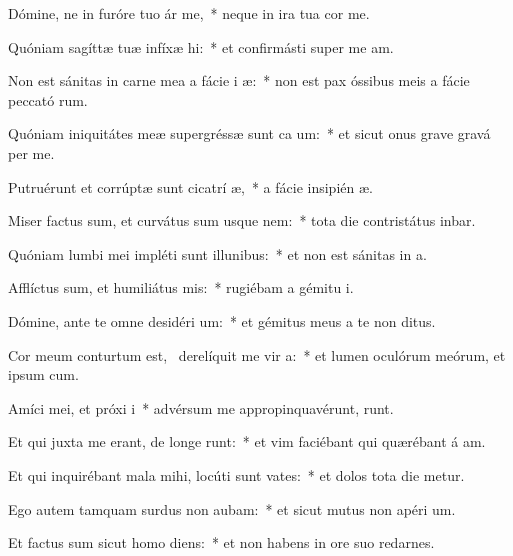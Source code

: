 \item Dómine, ne in furóre tuo ár me,~* neque in ira tua cor me.
\item Quóniam sagíttæ tuæ infíxæ  hi:~* et confirmásti super me  am.
\item Non est sánitas in carne mea a fácie i æ:~* non est pax óssibus meis a fácie peccató rum.
\item Quóniam iniquitátes meæ supergréssæ sunt ca um:~* et sicut onus grave gravá  per me.
\item Putruérunt et corrúptæ sunt cicatrí æ,~* a fácie insipién æ.
\item Miser factus sum, et curvátus sum usque  nem:~* tota die contristátus inbar.
\item Quóniam lumbi mei impléti sunt illunibus:~* et non est sánitas in  a.
\item Afflíctus sum, et humiliátus  mis:~* rugiébam a gémitu  i.
\item Dómine, ante te omne desidéri um:~* et gémitus meus a te non  ditus.
\item Cor meum conturtum est,~\pscross{} derelíquit me vir a:~* et lumen oculórum meórum, et ipsum   cum.
\item Amíci mei, et próxi i~* advérsum me appropinquavérunt,  runt.
\item Et qui juxta me erant, de longe runt:~* et vim faciébant qui quærébant á am.
\item Et qui inquirébant mala mihi, locúti sunt vates:~* et dolos tota die metur.
\item Ego autem tamquam surdus non aubam:~* et sicut mutus non apéri  um.
\item Et factus sum sicut homo  diens:~* et non habens in ore suo redarnes.
